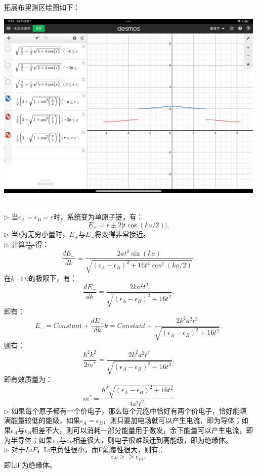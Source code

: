 \documentclass[reqno,a4paper,12pt]{amsart}
\begin{document}
\begin{tcolorbox}[breakable, colback = black!5!white, colframe = black]
\begin{centering}
\end{centering} \\
拓展布里渊区绘图如下：\\
\begin{centering}
	\includegraphics[scale=0.11]{extended11.2.jpg}
\end{centering} \\
$\triangleright$ 当$\epsilon_A = \epsilon_B = \epsilon$时，系统变为单原子链，有：
\[
	E_{\pm} = \epsilon \pm 2\vert t\cos(ka/2) \vert.
\]
$\triangleright$ 当$t$为无穷小量时，$E_+$与$E_-$将变得非常接近。 \\
$\triangleright$ 计算$\frac{dE_-}{dk}$得：
\[
	\frac{dE_-}{dk} = \frac{2at^2\sin(ka)}{\sqrt{(\epsilon_A-\epsilon_B)^2+16t^2\cos^2(ka/2)}}.
\]
在$k\to 0$的极限下，有：
\[
	\frac{dE_-}{dk} = \frac{2ka^2t^2}{\sqrt{(\epsilon_A-\epsilon_B)^2+16t^2}}.
\]
即有：
\[
	E_- = Constant + \frac{dE_-}{dk}k = Constant + \frac{2k^2a^2t^2}{\sqrt{(\epsilon_A-\epsilon_B)^2+16t^2}}.
\]
则有：
\[
	\frac{\hbar^2k^2}{2m^*} = \frac{2k^2a^2t^2}{\sqrt{(\epsilon_A-\epsilon_B)^2+16t^2}}.
\]
即有效质量为：
\[
	m^* = \frac{\hbar^2\sqrt{(\epsilon_A-\epsilon_B)^2+16t^2}}{4a^2t^2.}
\]
$\triangleright$ 如果每个原子都有一个价电子，那么每个元胞中恰好有两个价电子，恰好能填满能量较低的能级，如果$\epsilon_A = \epsilon_B$，则只要加电场就可以产生电流，即为导体；如果$\epsilon_A$与$\epsilon_B$相差不大，则可以消耗一部分能量用于激发，余下能量可以产生电流，即为半导体；如果$\epsilon_A$与$\epsilon_B$相差很大，则电子很难跃迁到高能级，即为绝缘体。 \\
$\triangleright$ 对于$LiF$，Li电负性很小，而F颠覆性很大，则有：
\[
	\epsilon_F >> \epsilon_{Li}.
\]
即LiF为绝缘体。
\end{tcolorbox}
\end{document}
